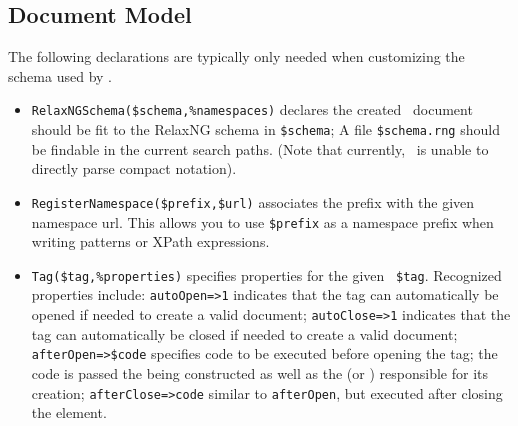 \documentclass{book}
\newcommand{\ltxcode}{\lstinline[style=latexml]}
\begin{document}
\subsection{Document Model}\label{customization.latexml.schema}
The following declarations are typically only needed when customizing
the schema used by \LaTeXML.
\begin{itemize}
\item \ltxcode|RelaxNGSchema($schema,%
 \XML\ document should be fit to the RelaxNG schema in \ltxcode|$schema|;
 A file \ltxcode|$schema.rng| should be findable in the current search paths.
(Note that currently, \LaTeXML\ is unable to directly parse compact notation).
\item \ltxcode|RegisterNamespace($prefix,$url)| associates the
 prefix with the given namespace url.  This allows you to use \ltxcode|$prefix|
 as a namespace prefix when writing  patterns or XPath expressions.
\item \ltxcode|Tag($tag,%
Recognized properties include:
\ltxcode|autoOpen=>1| indicates that the tag
can automatically be opened if needed to create a valid document;
\ltxcode|autoClose=>1| indicates that the tag can automatically be closed if needed to create
a valid document;
\ltxcode|afterOpen=>$code| specifies code to be executed before opening the tag;
the code is passed the  being constructed as well as the
 (or ) responsible for its creation;
\ltxcode|afterClose=>code| similar to \texttt{afterOpen}, but executed after closing
the element.
\end{itemize}
\end{document}
